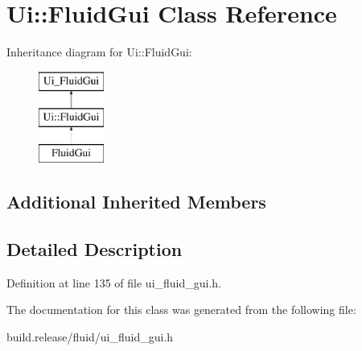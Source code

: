 \hypertarget{class_ui_1_1_fluid_gui}{}\section{Ui\+:\+:Fluid\+Gui Class Reference}
\label{class_ui_1_1_fluid_gui}
Inheritance diagram for Ui\+:\+:Fluid\+Gui\+:\begin{figure}[H]
\begin{center}
\leavevmode
\includegraphics[height=3.000000cm]{class_ui_1_1_fluid_gui}
\end{center}
\end{figure}
\subsection*{Additional Inherited Members}


\subsection{Detailed Description}


Definition at line 135 of file ui\+\_\+fluid\+\_\+gui.\+h.



The documentation for this class was generated from the following file\+:\begin{DoxyCompactItemize}
\item 
build.\+release/fluid/ui\+\_\+fluid\+\_\+gui.\+h\end{DoxyCompactItemize}
